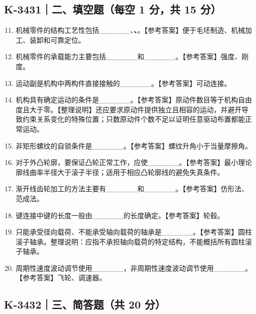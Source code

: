 \documentclass[zihao=5,a4paper,UTF8,fontset=fandol]{ctexart}
\begin{document}
\subsection{K-3431｜二、填空题（每空 1 分，共 15 分）}
\label{k-3431}

\begin{enumerate}
\setcounter{enumi}{10}
\item 
机械零件的结构工艺性包括\_\_\_\_\_\_、\textbf{\textbf{\textbf{、}}}。【参考答案】便于毛坯制造、机械加工、装卸和可靠定位。


\item 
机械零件的承载能力主要包括\_\_\_\_\_\_和\_\_\_\_\_\_。【参考答案】强度、刚度。


\item 
运动副是机构中两构件直接接触的\_\_\_\_\_\_。【参考答案】可动连接。


\item 
机构具有确定运动的条件是\_\_\_\_\_\_。【参考答案】原动件数目等于机构自由度且大于零。【整理说明】还应要求原动件提供独立且相容的运动，并避开导致约束关系变化的特殊位置；只数原动件个数不足以证明任意驱动布置都能正常运动。


\item 
非矩形螺纹的自锁条件是\_\_\_\_\_\_。【参考答案】螺纹升角小于当量摩擦角。


\item 
对于外凸轮廓，要保证凸轮正常工作，应使\_\_\_\_\_\_。【参考答案】最小理论廓线曲率半径大于滚子半径；适用于相应凸轮廓线的避免失真条件。


\item 
渐开线齿轮加工的方法主要有\_\_\_\_\_\_和\_\_\_\_\_\_。【参考答案】仿形法、范成法。


\item 
键连接中键的长度一般由\_\_\_\_\_\_的长度确定。【参考答案】轮毂。


\item 
只能承受径向载荷、不能承受轴向载荷的轴承是\_\_\_\_\_\_。【参考答案】圆柱滚子轴承。整理说明：应指不承担轴向载荷的特定结构，不能概括所有圆柱滚子轴承。


\item 
周期性速度波动调节使用\_\_\_\_\_\_，非周期性速度波动调节使用\_\_\_\_\_\_。【参考答案】飞轮、调速器。



\end{enumerate}




\subsection{K-3432｜三、简答题（共 20 分）}
\label{k-3432}
\end{document}
